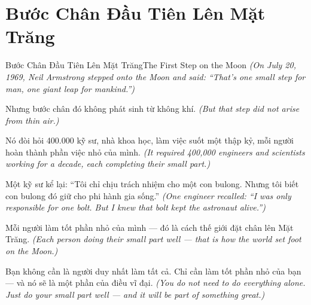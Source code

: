 \section{Bước Chân Đầu Tiên Lên Mặt Trăng}
\begin{truyen}{Bước Chân Đầu Tiên Lên Mặt Trăng}{The First Step on the Moon}
\textit{(On July 20, 1969, Neil Armstrong stepped onto the Moon and said: ``That's one small step for man, one giant leap for mankind.'')}

Nhưng bước chân đó không phát sinh từ không khí.
\textit{(But that step did not arise from thin air.)}

Nó đòi hỏi 400.000 kỹ sư, nhà khoa học, làm việc suốt một thập kỷ, mỗi người hoàn thành phần việc nhỏ của mình.
\textit{(It required 400,000 engineers and scientists working for a decade, each completing their small part.)}

Một kỹ sư kể lại: ``Tôi chỉ chịu trách nhiệm cho một con bulong. Nhưng tôi biết con bulong đó giữ cho phi hành gia sống.''
\textit{(One engineer recalled: ``I was only responsible for one bolt. But I knew that bolt kept the astronaut alive.'')}

Mỗi người làm tốt phần nhỏ của mình — đó là cách thế giới đặt chân lên Mặt Trăng.
\textit{(Each person doing their small part well — that is how the world set foot on the Moon.)}

\end{truyen}

\begin{baihoc}
Bạn không cần là người duy nhất làm tất cả. Chỉ cần làm tốt phần nhỏ của bạn — và nó sẽ là một phần của điều vĩ đại.
\textit{(You do not need to do everything alone. Just do your small part well — and it will be part of something great.)}
\end{baihoc}
\ngancach

